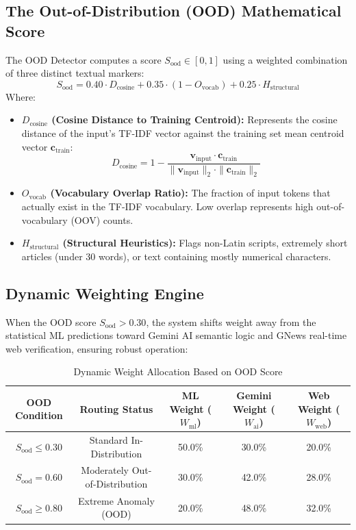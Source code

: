 \documentclass[11pt,a4paper,oneside]{article}
\begin{document}
\begin{tcolorbox}[title=\textbf{Technical Calibration Insight}]
\subsection{The Out-of-Distribution (OOD) Mathematical Score}
The OOD Detector computes a score $S_{\text{ood}} \in [0, 1]$ using a weighted combination of three distinct textual markers:
\begin{equation}
    S_{\text{ood}} = 0.40 \cdot D_{\text{cosine}} + 0.35 \cdot (1 - O_{\text{vocab}}) + 0.25 \cdot H_{\text{structural}}
\end{equation}
Where:
\begin{itemize}
    \item \textbf{$D_{\text{cosine}}$ (Cosine Distance to Training Centroid):} Represents the cosine distance of the input's TF-IDF vector against the training set mean centroid vector $\mathbf{c}_{\text{train}}$:
    \begin{equation}
        D_{\text{cosine}} = 1 - \frac{\mathbf{v}_{\text{input}} \cdot \mathbf{c}_{\text{train}}}{\|\mathbf{v}_{\text{input}}\|_2 \cdot \|\mathbf{c}_{\text{train}}\|_2}
    \end{equation}
    \item \textbf{$O_{\text{vocab}}$ (Vocabulary Overlap Ratio):} The fraction of input tokens that actually exist in the TF-IDF vocabulary. Low overlap represents high out-of-vocabulary (OOV) counts.
    \item \textbf{$H_{\text{structural}}$ (Structural Heuristics):} Flags non-Latin scripts, extremely short articles (under 30 words), or text containing mostly numerical characters.
\end{itemize}

\subsection{Dynamic Weighting Engine}
When the OOD score $S_{\text{ood}} > 0.30$, the system shifts weight away from the statistical ML predictions toward Gemini AI semantic logic and GNews real-time web verification, ensuring robust operation:
\begin{table}[h]
    \centering
    \caption{Dynamic Weight Allocation Based on OOD Score}
    \label{tab:dynamic_weights}
    \small
    \begin{tabular}{ccccc}
        \toprule
        \textbf{OOD Condition} & \textbf{Routing Status} & \textbf{ML Weight ($W_{\text{ml}}$)} & \textbf{Gemini Weight ($W_{\text{ai}}$)} & \textbf{Web Weight ($W_{\text{web}}$)} \\
        \midrule
        $S_{\text{ood}} \le 0.30$ & Standard In-Distribution & 50.0\% & 30.0\% & 20.0\% \\
        $S_{\text{ood}} = 0.60$ & Moderately Out-of-Distribution & 30.0\% & 42.0\% & 28.0\% \\
        $S_{\text{ood}} \ge 0.80$ & Extreme Anomaly (OOD) & 20.0\% & 48.0\% & 32.0\% \\
        \bottomrule
    \end{tabular}
\end{table}


\end{tcolorbox}
\end{document}
